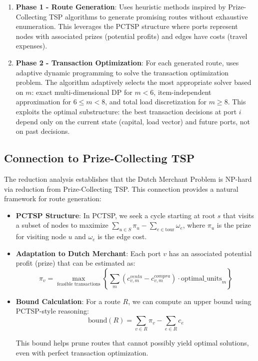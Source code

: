 \documentclass[12pt]{article}
\begin{document}
\begin{enumerate}
    \item \textbf{Phase 1 - Route Generation}: Uses heuristic methods inspired by Prize-Collecting TSP algorithms to generate promising routes without exhaustive enumeration. This leverages the PCTSP structure where ports represent nodes with associated prizes (potential profits) and edges have costs (travel expenses).
    
    \item \textbf{Phase 2 - Transaction Optimization}: For each generated route, uses adaptive dynamic programming to solve the transaction optimization problem. The algorithm adaptively selects the most appropriate solver based on $m$: exact multi-dimensional DP for $m < 6$, item-independent approximation for $6 \leq m < 8$, and total load discretization for $m \geq 8$. This exploits the optimal substructure: the best transaction decisions at port $i$ depend only on the current state (capital, load vector) and future ports, not on past decisions.
\end{enumerate}

\subsection{Connection to Prize-Collecting TSP}

The reduction analysis \cite{reduction2025} establishes that the Dutch Merchant Problem is NP-hard via reduction from Prize-Collecting TSP. This connection provides a natural framework for route generation:

\begin{itemize}
    \item \textbf{PCTSP Structure}: In PCTSP, we seek a cycle starting at root $s$ that visits a subset of nodes to maximize $\sum_{u \in S} \pi_u - \sum_{e \in \text{tour}} \omega_e$, where $\pi_u$ is the prize for visiting node $u$ and $\omega_e$ is the edge cost.
    
    \item \textbf{Adaptation to Dutch Merchant}: Each port $v$ has an associated potential profit (prize) that can be estimated as:
    $$\pi_v = \max_{\text{feasible transactions}} \left\{ \sum_{m} (c_{v,m}^{venta} - c_{v,m}^{compra}) \cdot \text{optimal\_units}_m \right\}$$
    
    \item \textbf{Bound Calculation}: For a route $R$, we can compute an upper bound using PCTSP-style reasoning:
    $$\text{bound}(R) = \sum_{v \in R} \pi_v - \sum_{e \in R} c_e$$
    
    This bound helps prune routes that cannot possibly yield optimal solutions, even with perfect transaction optimization.
\end{itemize}
\end{document}
